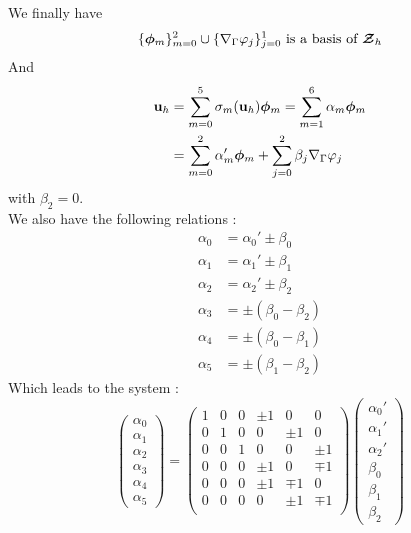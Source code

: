 We finally have \[ \{\bm{\phi}_m\}_{m=0}^2\cup\{{\nabla}_\Gamma\varphi_j\}_{j=0}^1
\mbox{ is a basis of } {\bm{\mathcal{Z}}}_h \]
And
\begin{align*}
{\mathbf{u}}_h &= \sum_{m=0}^5 \sigma_m({\mathbf{u}}_h) \bm{\phi}_m = \sum_{m=1}^6 \alpha_m \bm{\phi}_m\\
&= \sum_{m=0}^2 \alpha_m'\bm{\phi}_m + \sum_{j=0}^2 \beta_j{\nabla}_\Gamma\varphi_j
\end{align*}
with $\beta_2 = 0$.\\

We also have the following relations :
\begin{align*}
\alpha_0 &= \alpha_0' \pm \beta_0\\
\alpha_1 &= \alpha_1' \pm \beta_1\\
\alpha_2 &= \alpha_2' \pm \beta_2\\
\alpha_3 &= \pm(\beta_0-\beta_2)\\
\alpha_4 &= \pm(\beta_0-\beta_1)\\
\alpha_5 &= \pm(\beta_1-\beta_2)
\end{align*}
Which leads to the system :
\[ \begin{pmatrix}
\alpha_0\\\alpha_1\\\alpha_2\\\alpha_3\\\alpha_4\\\alpha_5
\end{pmatrix} = \begin{pmatrix}
1 & 0 & 0 & \pm 1 & 0 & 0\\
0 & 1 & 0 & 0 & \pm 1 & 0\\
0 & 0 & 1 & 0 & 0 & \pm 1\\
0 & 0 & 0 & \pm 1 & 0 & \mp 1\\
0 & 0 & 0 & \pm 1 & \mp 1 & 0\\
0 & 0 & 0 & 0 & \pm 1 & \mp 1\\
\end{pmatrix} \begin{pmatrix}
\alpha_0'\\\alpha_1'\\\alpha_2'\\\beta_0\\\beta_1\\\beta_2
\end{pmatrix} \]
